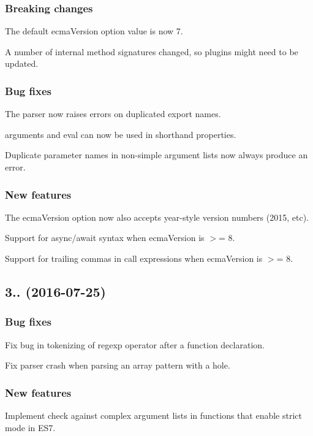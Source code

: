 \subsubsection*{Breaking changes}

The default {\ttfamily ecma\+Version} option value is now 7.

A number of internal method signatures changed, so plugins might need to be updated.

\subsubsection*{Bug fixes}

The parser now raises errors on duplicated export names.

{\ttfamily arguments} and {\ttfamily eval} can now be used in shorthand properties.

Duplicate parameter names in non-\/simple argument lists now always produce an error.

\subsubsection*{New features}

The {\ttfamily ecma\+Version} option now also accepts year-\/style version numbers (2015, etc).

Support for {\ttfamily async}/{\ttfamily await} syntax when {\ttfamily ecma\+Version} is $>$= 8.

Support for trailing commas in call expressions when {\ttfamily ecma\+Version} is $>$= 8.

\subsection*{3.. (2016-\/07-\/25)}

\subsubsection*{Bug fixes}

Fix bug in tokenizing of regexp operator after a function declaration.

Fix parser crash when parsing an array pattern with a hole.

\subsubsection*{New features}

Implement check against complex argument lists in functions that enable strict mode in E\+S7.

